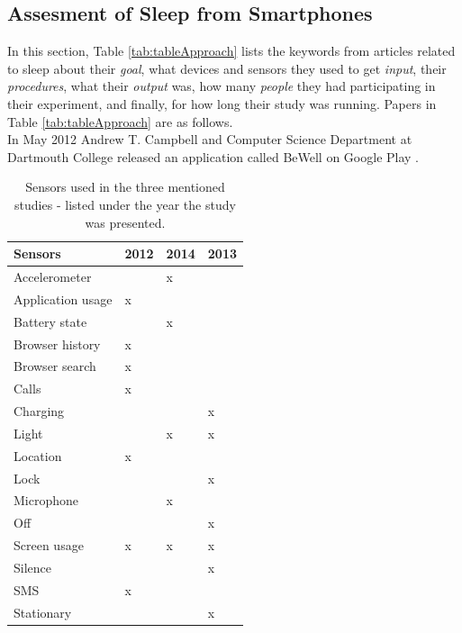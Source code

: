 \documentclass[12pt]{article} %
\begin{document}
\newpage
\subsection{Assesment of Sleep from Smartphones}
In this section, Table \ref{tab:tableApproach} lists the keywords from articles related to sleep about their \textit{goal}, what devices and sensors they used to get \textit{input}, their \textit{procedures}, what their \textit{output} was, how many \textit{people} they had participating in their experiment, and finally, for how long their study was running. Papers in Table \ref{tab:tableApproach} are as follows. \\

In May 2012 Andrew T. Campbell and Computer Science Department at Dartmouth College released an application called BeWell on Google Play \cite{bewellDartmouth}. 

\begin{table}
\center
\begin{footnotesize}
	\begin{tabular}{|p{2.8cm} |p{0.7cm} |p{0.7cm} |p{0.7cm} |}
	\hline
	\textbf{Sensors} & \textbf{2012} & \textbf{2014} & \textbf{2013} \\
	\hline
Accelerometer & & x & \\
Application usage & x & & 	\\
Battery state & & x & \\
Browser history & x & & \\
Browser search & x & & \\	
Calls & x & & \\
Charging & &  & x\\
Light & & x & x\\
Location & x & & \\
Lock & &  & x\\
Microphone & & x &\\
Off & &  & x\\
Screen usage & x & x & x\\
Silence & &  & x\\  
SMS & x & & 	\\
Stationary & &  & x\\
	\hline
	\end{tabular}
	\caption{Sensors used in the three mentioned studies - listed under the year the study was presented.}
	\label{tab:sensors}
\end{footnotesize}
\end{table}
\end{document}
